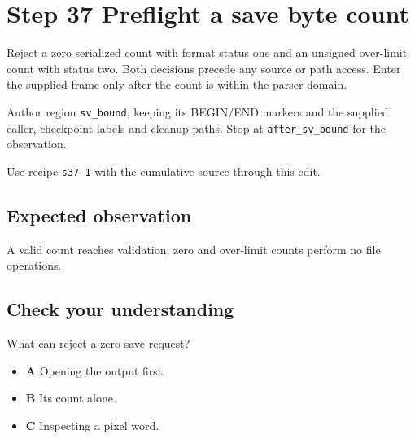 \section{Step 37 Preflight a save byte count}\label{ppm-s37}

Reject a zero serialized count with format status one and an unsigned over-limit count with status two. Both decisions precede any source or path access. Enter the supplied frame only after the count is within the parser domain.

Author region \texttt{sv\_bound}, keeping its BEGIN/END markers and the supplied caller, checkpoint labels and cleanup paths. Stop at \texttt{after\_sv\_bound} for the observation.

Use recipe \texttt{s37-1} with the cumulative source through this edit.

\subsection{Expected observation}
A valid count reaches validation; zero and over-limit counts perform no file operations.

\subsection{Check your understanding}
What can reject a zero save request?

\begin{itemize}
\item \textbf{A} Opening the output first.
\item \textbf{B} Its count alone.
\item \textbf{C} Inspecting a pixel word.
\end{itemize}
